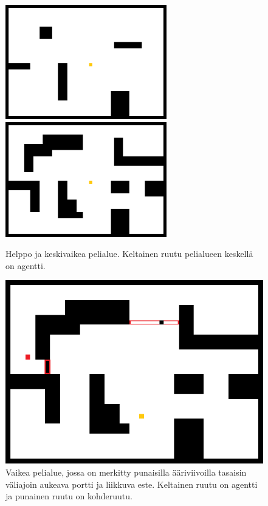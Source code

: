 \documentclass[utf8]{gradu3}
\begin{document}
\begin{figure}[h]
\includegraphics[width=7cm]{area_beginner.png}
\includegraphics[width=7cm]{area_intermediate.png}
\centering
\caption{Helppo ja keskivaikea pelialue. Keltainen ruutu pelialueen keskellä on agentti.}
\label{areabeginnerintermediate}
\end{figure}

\begin{figure}[h]
\includegraphics[width=13cm]{area_difficult.png}
\centering
\caption{Vaikea pelialue, jossa on merkitty punaisilla ääriviivoilla tasaisin väliajoin aukeava portti ja liikkuva este. Keltainen ruutu on agentti ja punainen ruutu on kohderuutu.}
\label{areadifficult}
\end{figure}
\end{document}
